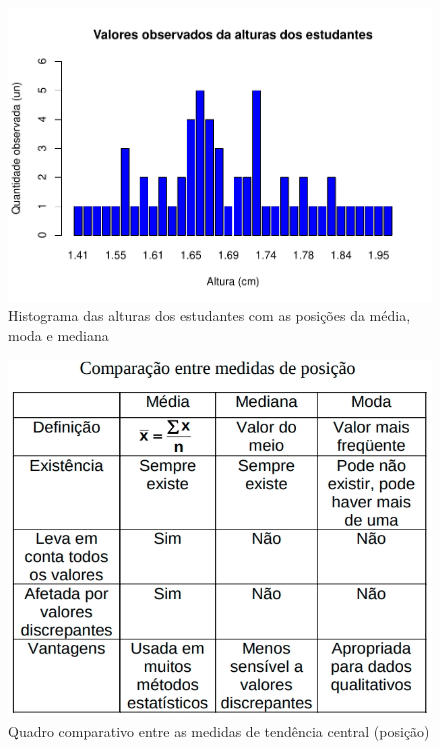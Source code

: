 \documentclass[
]{book}
\begin{document}
\begin{figure}

{\centering \includegraphics{apostila_files/figure-latex/unnamed-chunk-28-1} 

}

\caption{Histograma das alturas dos estudantes com as posições da média, moda e mediana}\label{fig:unnamed-chunk-28}
\end{figure}

\hfill\break

\begin{figure}

{\centering \includegraphics[width=0.8\linewidth]{images3/comp_sinteses} 

}

\caption{Quadro comparativo entre as medidas de tendência central (posição)}\label{fig:unnamed-chunk-29}
\end{figure}
\end{document}
